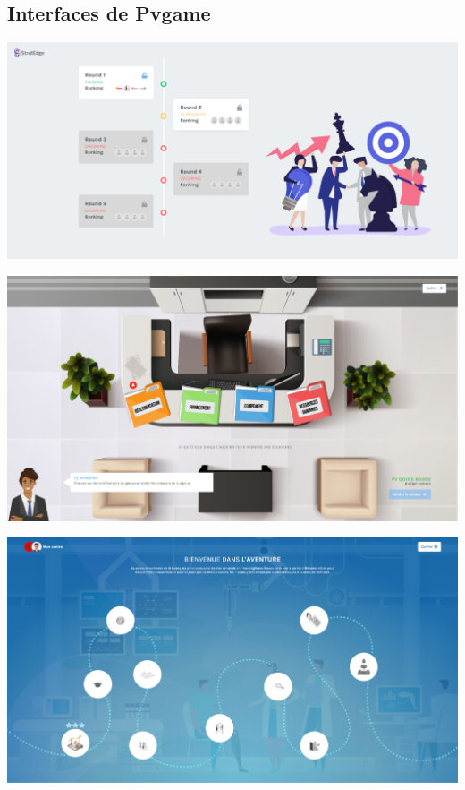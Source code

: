\subsection{Interfaces de Pvgame}



\begin{center}
\includegraphics[scale=0.25]{images/strat} 
\end{center} 


\begin{center}
\includegraphics[scale=0.15]{images/1} 
\end{center} 




\begin{center}
\includegraphics[scale=0.15]{images/2} 
\end{center}


